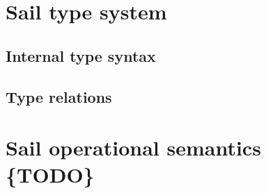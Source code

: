 \documentclass[11pt]{article}
\begin{document}
\section{Sail type system}

\subsection{Internal type syntax}

\ottgrammartabular{
\ottk\ottinterrule
\ottt\ottinterrule
\ottoptx\ottinterrule
\otttag\ottinterrule
\ottne\ottinterrule
\otttXXarg\ottinterrule
\otttXXargs\ottinterrule
\ottnec\ottinterrule
\ottSXXN\ottinterrule
\ottEXXd\ottinterrule
\ottkinf\ottinterrule
\otttid\ottinterrule
\ottEXXk\ottinterrule
\otttinf\ottinterrule
\ottEXXa\ottinterrule
\ottfieldXXtyps\ottinterrule
\ottEXXr\ottinterrule
\ottenumerateXXmap\ottinterrule
\ottEXXe\ottinterrule
\ottEXXt\ottinterrule
\ottts\ottinterrule
\ottE\ottinterrule
\ottI\ottinterrule
\ottformula\ottinterrule}


\subsection{ Type relations }
\ottdefnss

\section{Sail operational semantics \{TODO\}}
\end{document}
